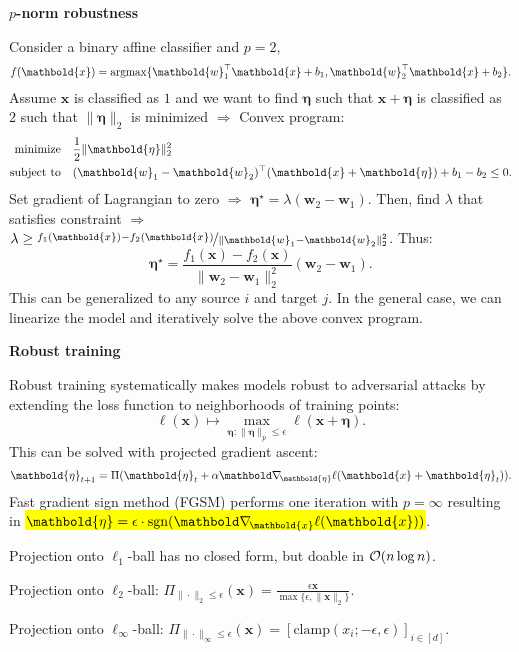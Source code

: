 \documentclass[10pt]{article}
\newenvironment{topic}[1]
{\textbf{\sffamily \footnotesize \colorbox{black}{\rlap{\textbf{\textcolor{white}{#1}}}\hspace{\linewidth}\hspace{-2\fboxsep}}}}
{}
\newenvironment{subtopic}[1]
{\begin{center}\textbf{\footnotesize \sffamily #1}\end{center}}
{}
\renewcommand{\vec}[1]{\ensuremath{\mathbold{#1}}}
\begin{document}
\begin{multicols*}{3}
\begin{topic}{Adversarial attacks}
\begin{subtopic}{$p$-norm robustness}
            Consider a binary affine classifier and $p=2$, \[
                f(\vec{x}) = \argmax \{ \transpose{\vec{w}_1} \vec{x} + b_1, \transpose{\vec{w}_2}\vec{x} + b_2 \}.
            \]
            Assume $\vec{x}$ is classified as $1$ and we want to find $\vec{\eta}$ such that $\vec{x} +
                \vec{\eta}$ is classified as $2$ such that $\| \vec{\eta} \|_2$ is minimized $\Rightarrow$ Convex program:
            \begin{align*}
                \text{minimize}   & \quad \frac{1}{2} \| \vec{\eta} \|_2^2                                               \\
                \text{subject to} & \quad \transpose{(\vec{w}_1 - \vec{w}_2)} (\vec{x} + \vec{\eta}) + b_1 - b_2 \leq 0.
            \end{align*}
            Set gradient of Lagrangian to zero $\Rightarrow$ $\vec{\eta}^\star = \lambda (\vec{w}_2 -
                \vec{w}_1)$. Then, find $\lambda$ that satisfies constraint $\Rightarrow$ $\lambda \geq
                \nicefrac{f_1(\vec{x}) - f_2(\vec{x})}{\| \vec{w}_1 - \vec{w}_2 \|_2^2}$. Thus: \[
                \vec{\eta}^\star = \frac{f_1(\vec{x}) - f_2(\vec{x})}{\| \vec{w}_2 - \vec{w}_1 \|_2^2} (\vec{w}_2 - \vec{w}_1).
            \]
            This can be generalized to any source $i$ and target $j$. In the general case, we can linearize the
            model and iteratively solve the above convex program.
        \end{subtopic}

        \begin{subtopic}{Robust training}
            Robust training systematically makes models robust to adversarial attacks by extending the loss function to neighborhoods of training points: \[
                \ell(\vec{x}) \mapsto \max_{\vec{\eta} : \| \vec{\eta} \|_p \leq \epsilon} \ell(\vec{x} + \vec{\eta}).
            \]
            This can be solved with projected gradient ascent: \[
                \vec{\eta}_{t+1} = \Pi(\vec{\eta}_t + \alpha \grad{\ell(\vec{x} + \vec{\eta}_t)}{\vec{\eta}}).
            \]
            Fast gradient sign method (FGSM) performs one iteration with $p=\infty$ resulting in \hl{$\vec{\eta} =
            \epsilon\cdot\mathrm{sgn}(\grad{\ell(\vec{x})}{\vec{x}})$}.

                Projection onto $\ell_1$-ball has no closed form, but doable in $\bigo{n\log n}$.

            Projection onto $\ell_2$-ball: $\Pi_{\| \cdot \|_2 \leq \epsilon}(\vec{x}) = \frac{\epsilon \vec{x}}{\max \{ \epsilon, \| \vec{x} \|_2 \}}$.

            Projection onto $\ell_{\infty}$-ball: $\Pi_{\| \cdot \|_{\infty} \leq \epsilon}(\vec{x}) = [\mathrm{clamp}(x_i; -\epsilon, \epsilon)]_{i \in [d]}$.

        \end{subtopic}

    \end{topic}

\end{multicols*}
\end{document}
